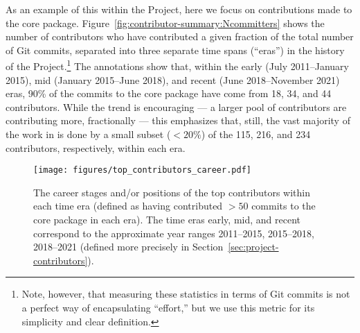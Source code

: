 \documentclass[modern]{aastex631}
\begin{document}
As an example of this within the \astropy Project, here we focus on
contributions made to the \astropypkg core package.
Figure~\ref{fig:contributor-summary:Ncommitters} shows the number of
contributors who have contributed a given fraction of the total number of Git
commits, separated into three separate time spans (``eras'') in the history of
the Project.\footnote{Note, however, that measuring these statistics in terms of
Git commits is not a perfect way of encapsulating ``effort,'' but we use this
metric for its simplicity and clear definition.}
The annotations show that, within the early (July 2011--January 2015), mid
(January 2015--June 2018), and recent (June 2018--November 2021) eras, 90\% of
the commits to the \astropypkg core package have come from 18, 34, and 44
contributors.
While the trend is encouraging --- a larger pool of contributors are
contributing more, fractionally --- this emphasizes that, still, the vast
majority of the work in \astropypkg is done by a small subset ($<20\%$) of the
115, 216, and 234 contributors, respectively, within each era.

\begin{figure}[t!]
    \begin{centering}
      \texttt{[image: figures/top\_contributors\_career.pdf]}
        \caption{
            The career stages and/or positions of the top contributors within
            each time era (defined as having contributed $>50$ commits to the
            \astropypkg core package in each era).
            The time eras early, mid, and recent correspond to the approximate
            year ranges 2011--2015, 2015--2018, 2018--2021 (defined more
            precisely in Section~\ref{sec:project-contributors}).
        }
        \label{fig:contributor-summary:top}
    \end{centering}
\end{figure}
\end{document}
